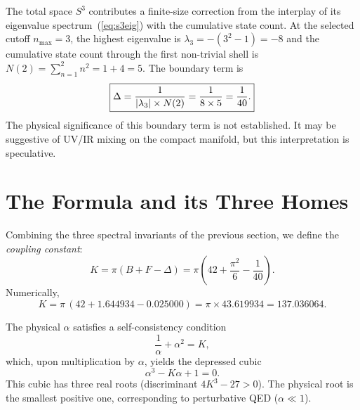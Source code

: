 \documentclass[aps,prl,twocolumn,superscriptaddress]{revtex4-2}
\begin{document}
The total space $S^3$ contributes a finite-size correction from
the interplay of its eigenvalue spectrum~(\ref{eq:s3eig}) with the
cumulative state count. At the selected cutoff $n_{\max} = 3$, the
highest eigenvalue is $\lambda_3 = -(3^2 - 1) = -8$ and the
cumulative state count through the first non-trivial shell is
$N(2) = \sum_{n=1}^{2} n^2 = 1 + 4 = 5$. The boundary term is
\begin{equation}\label{eq:boundary}
  \boxed{\Delta = \frac{1}{|\lambda_3| \times N(2)}
                = \frac{1}{8 \times 5} = \frac{1}{40}.}
                \vphantom{\Bigg|}
\end{equation}
The physical significance of this boundary term is not established.
It may be suggestive of UV/IR mixing on the compact manifold, but
this interpretation is speculative.


%
\section{The Formula and its Three Homes}\label{sec:formula}

Combining the three spectral invariants of the previous section, we
define the \textit{coupling constant}:
\begin{equation}\label{eq:K}
  K = \pi\!\left(B + F - \Delta\right)
    = \pi\!\left(42 + \frac{\pi^2}{6} - \frac{1}{40}\right).
\end{equation}
Numerically,
\begin{equation}
  K = \pi\,(42 + 1.644934 - 0.025000)
    = \pi \times 43.619934
    = 137.036064.
\end{equation}

The physical $\alpha$ satisfies a self-consistency condition
\begin{equation}\label{eq:selfconsistent}
  \frac{1}{\alpha} + \alpha^2 = K,
\end{equation}
which, upon multiplication by $\alpha$, yields the depressed cubic
\begin{equation}\label{eq:cubic}
  \boxed{\alpha^3 - K\alpha + 1 = 0.}
\end{equation}
This cubic has three real roots (discriminant $4K^3 - 27 > 0$). The
physical root is the smallest positive one, corresponding to
perturbative QED ($\alpha \ll 1$).
\end{document}
